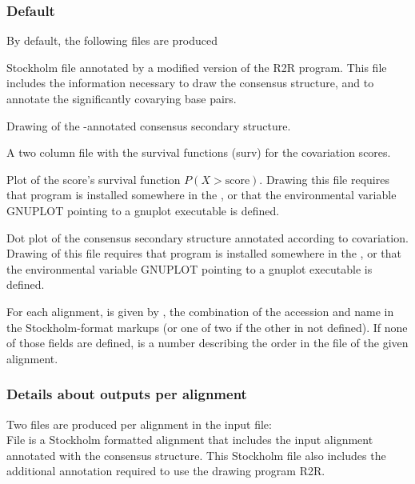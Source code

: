 \subsubsection{Default}
By default, the following files are produced

\begin{sreitems}{}
\item[\emprog{rnafile\_msaname.R2R.sto}] Stockholm file annotated by a
  modified version of the R2R program. This file includes the
  information necessary to draw the consensus structure, and to
  annotate the significantly covarying base pairs.
%
\item[\emprog{rnafile\_msaname.R2R.sto.\{pdf,svg\}}] Drawing of the
  \rscape-annotated consensus secondary structure.
%
\item[\emprog{rnafile\_msaname.surv}] A two column file with the 
survival functions (surv) for the covariation scores.
%
\item[\emprog{rnafile\_msaname.surv.ps}] Plot of the score's survival function
$P(X > \mbox{score})$. Drawing this
file requires that program  is installed somewhere in
the
, or that the environmental variable GNUPLOT 
pointing to a gnuplot executable is defined.
%
\item[\emprog{rnafile\_msaname.dplot.\{ps,svg\}}] Dot plot of the consensus
  secondary structure annotated according to covariation. Drawing of this
file requires that program  is installed somewhere in the
, or that the environmental variable GNUPLOT 
pointing to a gnuplot executable is defined.
%
\end{sreitems}
For each alignment,  is given
by , the combination of the accession  and name  in the Stockholm-format markups (or
one of two if the other in not defined).  If none of those fields are
defined,  is a number describing the order in the
file of the given alignment.

\subsubsection{Details about outputs per alignment}
 Two files are produced per alignment in the input file: \\

 File  is a Stockholm
 formatted alignment that includes the input alignment annotated with
 the consensus structure. This Stockholm file also includes the
 additional annotation required to use the drawing program R2R.

